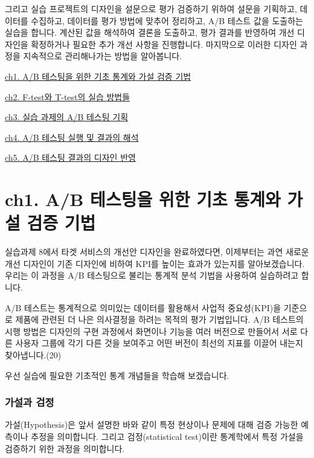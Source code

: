 \documentclass[
  letterpaper,
]{book}
\begin{document}
그리고 실습 프로젝트의 디자인을 설문으로 평가 검증하기 위하여 설문을
기획하고, 데이터를 수집하고, 데이터를 평가 방법에 맞추어 정리하고, A/B
테스트 값을 도출하는 실습을 합니다. 계산된 값을 해석하여 결론을
도출하고, 평가 결과를 반영하여 개선 디자인을 확정하거나 필요한 추가 개선
사항을 진행합니다. 마지막으로 이러한 디자인 과정을 지속적으로
관리해나가는 방법을 알아봅니다.

\href{ch1.\%20AB\%20테스팅을\%20위한\%20기초\%20통계와\%20가설\%20검증\%20기법.qmd}{ch1.
A/B 테스팅을 위한 기초 통계와 가설 검증 기법}

\href{ch2.\%20F-test와\%20T-test의\%20실습\%20방법들.qmd}{ch2. F-test와
T-test의 실습 방법들}

\href{ch3.\%20실습\%20과제의\%20AB\%20테스팅\%20기획.qmd}{ch3. 실습
과제의 A/B 테스팅 기획}

\href{ch4.\%20AB\%20테스팅\%20실행\%20및\%20결과의\%20해석.qmd}{ch4. A/B
테스팅 실행 및 결과의 해석}

\href{ch5.\%20AB\%20테스팅\%20결과의\%20디자인\%20반영.qmd}{ch5. A/B
테스팅 결과의 디자인 반영}

\chapter{ch1. A/B 테스팅을 위한 기초 통계와 가설 검증
기법}\label{ch1.-ab-uxd14cuxc2a4uxd305uxc744-uxc704uxd55c-uxae30uxcd08-uxd1b5uxacc4uxc640-uxac00uxc124-uxac80uxc99d-uxae30uxbc95}

실습과제 8에서 타겟 서비스의 개선안 디자인을 완료하였다면, 이제부터는
과연 새로운 개선 디자인이 기존 디자인에 비하여 KPI를 높이는 효과가
있는지를 알아보겠습니다. 우리는 이 과정을 A/B 테스팅으로 불리는 통계적
분석 기법을 사용하여 실습하려고 합니다.

A/B 테스트는 통계적으로 의미있는 데이터를 활용해서 사업적 중요성(KPI)을
기준으로 제품에 관련된 더 나은 의사결정을 하려는 목적의 평가 기법입니다.
A/B 테스트의 시행 방법은 디자인의 구현 과정에서 화면이나 기능을 여러
버전으로 만들어서 서로 다른 사용자 그룹에 각기 다른 것을 보여주고 어떤
버전이 최선의 지표를 이끌어 내는지 찾아냅니다.(20)

우선 실습에 필요한 기초적인 통계 개념들을 학습해 보겠습니다.

\subsection{가설과 검정}\label{uxac00uxc124uxacfc-uxac80uxc815}

가설(Hypothesis)은 앞서 설명한 바와 같이 특정 현상이나 문제에 대해 검증
가능한 예측이나 추정을 의미합니다. 그리고 검정(statistical test)이란
통계학에서 특정 가설을 검증하기 위한 과정을 의미합니다.
\end{document}
